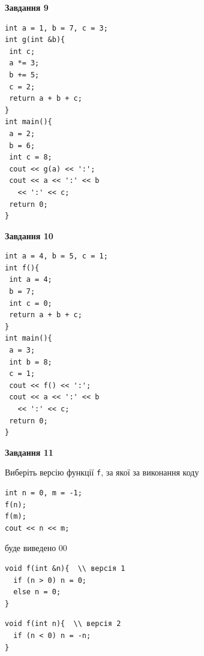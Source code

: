 \documentclass[12pt, ukrainian]{article}
\def\code#1{\Verb!#1!}
\begin{document}
{\begin {large}
\begin{minipage}[t]{11.0cm}
\end{minipage}


\begin{minipage}[t]{7.0cm}

\begin{center}
\textbf{Завдання 9}
\end{center}
\vspace{-8mm}

\begin{verbatim}
int a = 1, b = 7, c = 3;
int g(int &b){
 int c;
 a *= 3;
 b += 5;
 c = 2;
 return a + b + c;
}
int main(){
 a = 2;
 b = 6;
 int c = 8;
 cout << g(a) << ':';
 cout << a << ':' << b 
   << ':' << c;
 return 0;
}
\end{verbatim}



\begin{center}
\textbf{Завдання 10}
\end{center}
\vspace{-8mm}

\begin{verbatim}
int a = 4, b = 5, c = 1;
int f(){
 int a = 4;
 b = 7;
 int c = 0;
 return a + b + c;
}
int main(){
 a = 3;
 int b = 8;
 c = 1;
 cout << f() << ':';
 cout << a << ':' << b 
   << ':' << c;
 return 0;
}
\end{verbatim}

\end{minipage}
\vline \hspace{1mm}
\begin{minipage}[t]{11.0cm}

\begin{center}
\textbf{Завдання 11}
\end{center}
Виберіть версію функції \code{f}, за якої за виконання коду
\begin{verbatim}
int n = 0, m = -1;
f(n);
f(m);
cout << n << m;
\end{verbatim}

буде виведено 00

\begin{verbatim}
void f(int &n){  \\ версія 1
  if (n > 0) n = 0;
  else n = 0;
}
\end{verbatim}

\vspace{-8mm}\begin{verbatim}
void f(int n){  \\ версія 2
  if (n < 0) n = -n;
}
\end{verbatim}


\end{minipage}
\end{large}}
\end{document}

